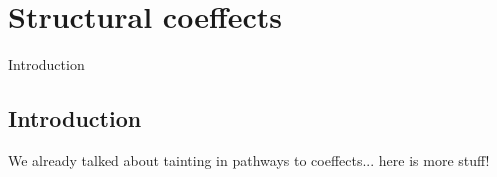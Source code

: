 \chapter{Structural coeffects} 
\label{ch:structural} 

\newcommand{\ctimes}{ \hat{\times} }
\newcommand{\cdupl}[0]{ \Delta } %

\newcommand{\clflt}{$\lambda_{\textnormal{\sffamily Cf}}$}
\newcommand{\clstr}{$\lambda_{\textnormal{\sffamily Cs}}$}

\newcommand{\ruleft}[1]{\textsf{\clflt\small{-T#1}}}
\newcommand{\rulefs}[1]{\textsf{\clflt\small{-S#1}}}
\newcommand{\rulest}[1]{\textsf{\clstr\small{-T#1}}}
\newcommand{\ruless}[1]{\textsf{\clstr\small{-S#1}}}
\newcommand{\rulessc}[1]{\textsf{\clstr\small{-SC#1}}}


Introduction


\section{Introduction}
\label{sec:structural-intro}

We already talked about tainting in pathways to coeffects... here is more stuff!

~

~

